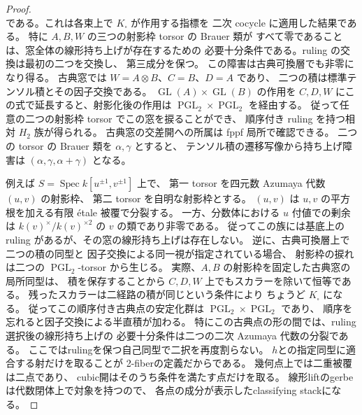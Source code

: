 \begin{proof}
\[\]
である。これは各束上で $K_\square$ が作用する指標を
二次 cocycle に適用した結果である。
特に $A,B,W$ の三つの射影枠 torsor の Brauer 類が
すべて零であることは、窓全体の線形持ち上げが存在するための
必要十分条件である。ruling の交換は最初の二つを交換し、
第三成分を保つ。
この障害は古典可換層でも非零になり得る。
古典窓では $W=A\otimes B$、$C=B$、$D=A$ であり、
二つの積は標準テンソル積とその因子交換である。
$\operatorname{GL}(A)\times\operatorname{GL}(B)$ の作用を
$C,D,W$ にこの式で延長すると、射影化後の作用は
$\operatorname{PGL}_2\times\operatorname{PGL}_2$ を経由する。
従って任意の二つの射影枠 torsor でこの窓を捩ることができ、
順序付き ruling を持つ相対 $H_2$ 族が得られる。
古典窓の交差開への所属は fppf 局所で確認できる。
二つの torsor の Brauer 類を $\alpha,\gamma$ とすると、
テンソル積の遷移写像から持ち上げ障害は
$(\alpha,\gamma,\alpha+\gamma)$ となる。

例えば $S=\operatorname{Spec}k[u^{\pm1},v^{\pm1}]$ 上で、
第一 torsor を四元数 Azumaya 代数 $(u,v)$ の射影枠、
第二 torsor を自明な射影枠とする。
$(u,v)$ は $u,v$ の平方根を加える有限 \'etale 被覆で分裂する。
一方、分数体における $u$ 付値での剰余は
$k(v)^\times/k(v)^{\times2}$ の $v$ の類であり非零である。
従ってこの族には基底上の ruling があるが、その窓の線形持ち上げは存在しない。
逆に、古典可換層上で二つの積の同型と
因子交換による同一視が指定されている場合、
射影枠の捩れは二つの $\operatorname{PGL}_2$-torsor から生じる。
実際、$A,B$ の射影枠を固定した古典窓の局所同型は、
積を保存することから $C,D,W$ 上でもスカラーを除いて恒等である。
残ったスカラーは二経路の積が同じという条件により
ちょうど $K_\square$ になる。
従ってこの順序付き古典点の安定化群は
$\operatorname{PGL}_2\times\operatorname{PGL}_2$ であり、
順序を忘れると因子交換による半直積が加わる。
特にこの古典点の形の間では、ruling 選択後の線形持ち上げの
必要十分条件は二つの二次 Azumaya 代数の分裂である。
ここではrulingを保つ自己同型で二択を再度割らない。
$h$との指定同型に適合する射だけを取ることが
2-fiberの定義だからである。
幾何点上では二重被覆は二点であり、
cubic開はそのうち条件を満たす点だけを取る。
線形liftのgerbeは代数閉体上で対象を持つので、
各点の成分が表示したclassifying stackになる。
\end{proof}

